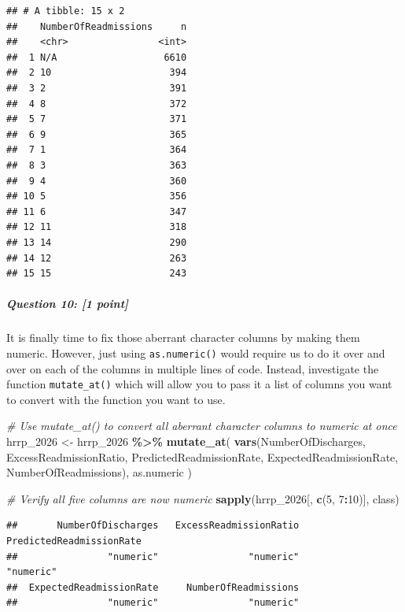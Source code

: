 \documentclass[
]{article}
\newenvironment{Shaded}{\begin{snugshade}}{\end{snugshade}}
\newcommand{\CommentTok}[1]{\textcolor[rgb]{0.56,0.35,0.01}{\textit{#1}}}
\newcommand{\DecValTok}[1]{\textcolor[rgb]{0.00,0.00,0.81}{#1}}
\newcommand{\FunctionTok}[1]{\textcolor[rgb]{0.13,0.29,0.53}{\textbf{#1}}}
\newcommand{\NormalTok}[1]{#1}
\newcommand{\OtherTok}[1]{\textcolor[rgb]{0.56,0.35,0.01}{#1}}
\newcommand{\SpecialCharTok}[1]{\textcolor[rgb]{0.81,0.36,0.00}{\textbf{#1}}}
\begin{document}
\begin{verbatim}
## # A tibble: 15 x 2
##    NumberOfReadmissions     n
##    <chr>                <int>
##  1 N/A                   6610
##  2 10                     394
##  3 2                      391
##  4 8                      372
##  5 7                      371
##  6 9                      365
##  7 1                      364
##  8 3                      363
##  9 4                      360
## 10 5                      356
## 11 6                      347
## 12 11                     318
## 13 14                     290
## 14 12                     263
## 15 15                     243
\end{verbatim}

\subparagraph{\texorpdfstring{\textbf{Question 10}: {[}1
point{]}}{Question 10: {[}1 point{]}}}\label{question-10-1-point}

It is finally time to fix those aberrant character columns by making
them numeric. However, just using \texttt{as.numeric()} would require us
to do it over and over on each of the columns in multiple lines of code.
Instead, investigate the function \texttt{mutate\_at()} which will allow
you to pass it a list of columns you want to convert with the function
you want to use.

\begin{Shaded}
\begin{Highlighting}[]
\CommentTok{\# Use mutate\_at() to convert all aberrant character columns to numeric at once}
\NormalTok{hrrp\_2026 }\OtherTok{\textless{}{-}}\NormalTok{ hrrp\_2026 }\SpecialCharTok{\%\textgreater{}\%}
    \FunctionTok{mutate\_at}\NormalTok{(}
        \FunctionTok{vars}\NormalTok{(NumberOfDischarges, ExcessReadmissionRatio, }
\NormalTok{             PredictedReadmissionRate, ExpectedReadmissionRate, }
\NormalTok{             NumberOfReadmissions),}
\NormalTok{        as.numeric}
\NormalTok{    )}

\CommentTok{\# Verify all five columns are now numeric}
\FunctionTok{sapply}\NormalTok{(hrrp\_2026[, }\FunctionTok{c}\NormalTok{(}\DecValTok{5}\NormalTok{, }\DecValTok{7}\SpecialCharTok{:}\DecValTok{10}\NormalTok{)], class)}
\end{Highlighting}
\end{Shaded}

\begin{verbatim}
##       NumberOfDischarges   ExcessReadmissionRatio PredictedReadmissionRate 
##                "numeric"                "numeric"                "numeric" 
##  ExpectedReadmissionRate     NumberOfReadmissions 
##                "numeric"                "numeric"
\end{verbatim}
\end{document}
